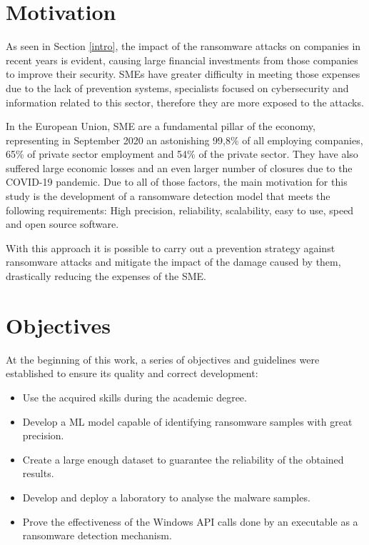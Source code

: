 \section{Motivation}
\noindent As seen in Section \ref{intro}, the impact of the ransomware attacks on companies in recent years is evident, causing large financial investments from those companies to improve their security.
\gls{SME}s have greater difficulty in meeting those expenses due to the lack of prevention systems, specialists focused on cybersecurity and information related to this sector, therefore they are more exposed to the attacks.


In the European Union, \gls{SME} are a fundamental pillar of the economy, representing in September 2020 an astonishing 99,8\% of all employing companies, 65\% of private sector employment and 54\% of the private sector. They have also suffered large economic losses and an even larger number of closures \cite{NBER} due to the \gls{COVID-19} pandemic.
Due to all of those factors, the main motivation for this study is the development of a ransomware detection model that meets the following requirements: High precision, reliability, scalability, easy to use, speed and open source software.


With this approach it is possible to carry out a prevention strategy against ransomware attacks and mitigate the impact of the damage caused by them, drastically reducing the expenses of the \gls{SME}.




\section{Objectives}
\noindent At the beginning of this work, a series of objectives and guidelines were established to ensure its quality and correct development:
\begin{itemize}
    \item Use the acquired skills during the academic degree.
    \item Develop a \gls{ML} model capable of identifying ransomware samples with great precision.
    \item Create a large enough dataset to guarantee the reliability of the obtained results.
    \item Develop and deploy a laboratory to analyse the malware samples.
    \item Prove the effectiveness of the Windows \gls{API} calls done by an executable as a ransomware detection mechanism.
\end{itemize}


